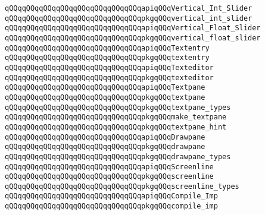 \newline
\verb|qQQqqQQqqQQqqQQqqQQqqQQqqQQqqQQqapiqQQqVertical_Int_Slider|\newline
\verb|qQQqqQQqqQQqqQQqqQQqqQQqqQQqqQQqpkgqQQqvertical_int_slider|\newline
\newline
\verb|qQQqqQQqqQQqqQQqqQQqqQQqqQQqqQQqapiqQQqVertical_Float_Slider|\newline
\verb|qQQqqQQqqQQqqQQqqQQqqQQqqQQqqQQqpkgqQQqvertical_float_slider|\newline
\newline
\verb|qQQqqQQqqQQqqQQqqQQqqQQqqQQqqQQqapiqQQqTextentry|\newline
\verb|qQQqqQQqqQQqqQQqqQQqqQQqqQQqqQQqpkgqQQqtextentry|\newline
\newline
\verb|qQQqqQQqqQQqqQQqqQQqqQQqqQQqqQQqapiqQQqTexteditor|\newline
\verb|qQQqqQQqqQQqqQQqqQQqqQQqqQQqqQQqpkgqQQqtexteditor|\newline
\newline
\verb|qQQqqQQqqQQqqQQqqQQqqQQqqQQqqQQqapiqQQqTextpane|\newline
\verb|qQQqqQQqqQQqqQQqqQQqqQQqqQQqqQQqpkgqQQqtextpane|\newline
\verb|qQQqqQQqqQQqqQQqqQQqqQQqqQQqqQQqpkgqQQqtextpane_types|\newline
\verb|qQQqqQQqqQQqqQQqqQQqqQQqqQQqqQQqpkgqQQqmake_textpane|\newline
\verb|qQQqqQQqqQQqqQQqqQQqqQQqqQQqqQQqpkgqQQqtextpane_hint|\newline
\newline
\verb|qQQqqQQqqQQqqQQqqQQqqQQqqQQqqQQqapiqQQqDrawpane|\newline
\verb|qQQqqQQqqQQqqQQqqQQqqQQqqQQqqQQqpkgqQQqdrawpane|\newline
\verb|qQQqqQQqqQQqqQQqqQQqqQQqqQQqqQQqpkgqQQqdrawpane_types|\newline
\newline
\verb|qQQqqQQqqQQqqQQqqQQqqQQqqQQqqQQqapiqQQqScreenline|\newline
\verb|qQQqqQQqqQQqqQQqqQQqqQQqqQQqqQQqpkgqQQqscreenline|\newline
\verb|qQQqqQQqqQQqqQQqqQQqqQQqqQQqqQQqpkgqQQqscreenline_types|\newline
\newline
\verb|qQQqqQQqqQQqqQQqqQQqqQQqqQQqqQQqapiqQQqCompile_Imp|\newline
\verb|qQQqqQQqqQQqqQQqqQQqqQQqqQQqqQQqpkgqQQqcompile_imp|\newline
